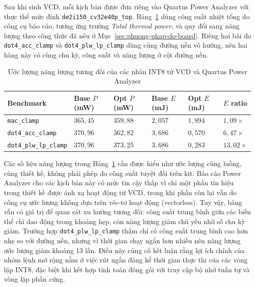 \documentclass[../DoAn.tex]{subfiles}
\begin{document}
Sau khi sinh VCD, mỗi kịch bản được đưa riêng vào Quartus Power Analyzer với thực thể mức đỉnh \texttt{de2i150\_cv32e40p\_top}. Bảng~\ref{tab:int8-kernel-energy-estimate} dùng công suất nhiệt tổng do công cụ báo cáo, tương ứng trường \textit{Total thermal power}, và quy đổi sang năng lượng theo công thức đã nêu ở Mục~\ref{sec:phuong-phap-do-board}. Riêng hai bài đo \texttt{dot4\_acc\_clamp} và \texttt{dot4\_plw\_lp\_clamp} dùng cùng đường nền vô hướng, nên hai hàng này có cùng chu kỳ, công suất và năng lượng ở cột đường nền.

\begin{table}[H]
    \centering
    \footnotesize
    \setlength{\tabcolsep}{4pt}
    \renewcommand{\arraystretch}{1.12}
    \begin{tabular}{|>{\raggedright\arraybackslash}p{4.20cm}|>{\centering\arraybackslash}p{1.65cm}|>{\centering\arraybackslash}p{1.65cm}|>{\centering\arraybackslash}p{1.55cm}|>{\centering\arraybackslash}p{1.55cm}|>{\centering\arraybackslash}p{1.45cm}|}
        \hline
        \textbf{Benchmark} & \textbf{Base \(P\) (mW)} & \textbf{Opt \(P\) (mW)} & \textbf{Base \(E\) (mJ)} & \textbf{Opt \(E\) (mJ)} & \textbf{\(E\) ratio} \\
        \hline
        \texttt{mac\_clamp} & \(365{,}45\) & \(359{,}88\) & \(2{,}057\) & \(1{,}894\) & \(1{,}09\times\) \\
        \hline
        \texttt{dot4\_acc\_clamp} & \(370{,}96\) & \(362{,}82\) & \(3{,}686\) & \(0{,}570\) & \(6{,}47\times\) \\
        \hline
        \texttt{dot4\_plw\_lp\_clamp} & \(370{,}96\) & \(373{,}25\) & \(3{,}686\) & \(0{,}283\) & \(13{,}02\times\) \\
        \hline
    \end{tabular}
    \caption{Ước lượng năng lượng tương đối của các nhân INT8 từ VCD và Quartus Power Analyzer}
    \label{tab:int8-kernel-energy-estimate}
\end{table}

Các số liệu năng lượng trong Bảng~\ref{tab:int8-kernel-energy-estimate} cần được hiểu như ước lượng cùng luồng, cùng thiết kế, không phải phép đo công suất tuyệt đối trên kit. Báo cáo Power Analyzer cho các kịch bản này có mức tin cậy thấp vì chỉ một phần tín hiệu trong thiết kế được ánh xạ hoạt động từ VCD, trong khi phần còn lại vẫn do công cụ ước lượng không dựa trên véc-tơ hoạt động (vectorless). Tuy vậy, bảng vẫn có giá trị để quan sát xu hướng tương đối: công suất trung bình giữa các biến thể chỉ dao động trong khoảng hẹp, còn năng lượng giảm chủ yếu nhờ số chu kỳ giảm. Trường hợp \texttt{dot4\_plw\_lp\_clamp} thậm chí có công suất trung bình cao hơn nhẹ so với đường nền, nhưng vì thời gian chạy ngắn hơn nhiều nên năng lượng ước lượng giảm khoảng 13 lần. Điều này củng cố kết luận rằng lợi ích chính của nhóm lệnh mở rộng nằm ở việc rút ngắn đáng kể thời gian thực thi của các vòng lặp INT8, đặc biệt khi kết hợp tính toán đóng gói với truy cập bộ nhớ tuần tự và vòng lặp phần cứng.
\end{document}
